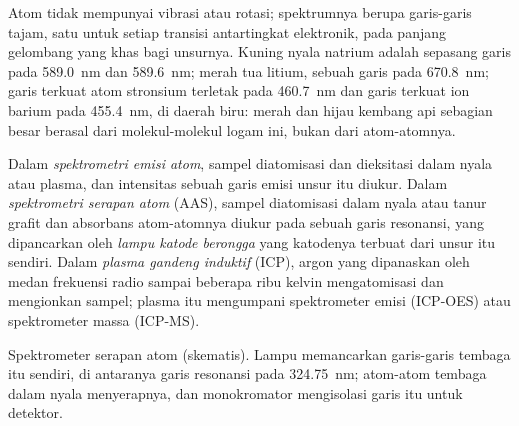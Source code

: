 Atom tidak mempunyai vibrasi atau rotasi; spektrumnya berupa garis-garis
tajam, satu untuk setiap transisi antartingkat elektronik, pada panjang
gelombang yang khas bagi unsurnya. Kuning nyala natrium adalah sepasang garis
pada \qty{589.0}{nm} dan \qty{589.6}{nm}; merah tua litium, sebuah garis pada
\qty{670.8}{nm}; garis terkuat atom stronsium terletak pada \qty{460.7}{nm}
dan garis terkuat ion barium pada
\qty{455.4}{nm}, di daerah biru: merah dan hijau kembang api sebagian besar
berasal dari molekul-molekul logam ini, bukan dari atom-atomnya.

\begin{definition}\label{def:b2:mass-spec-atomic:atomic}
Dalam \emph{spektrometri emisi atom}, sampel
diatomisasi dan dieksitasi dalam nyala atau plasma, dan intensitas sebuah
garis emisi unsur itu diukur. Dalam
\emph{spektrometri serapan atom} (AAS),
sampel diatomisasi dalam nyala atau tanur grafit dan absorbans atom-atomnya
diukur pada sebuah garis resonansi, yang dipancarkan oleh \emph{lampu katode
berongga} yang katodenya terbuat dari unsur itu
sendiri. Dalam \emph{plasma gandeng induktif}
(ICP), argon yang dipanaskan oleh medan frekuensi radio sampai beberapa ribu
kelvin mengatomisasi dan mengionkan sampel; plasma itu mengumpani
spektrometer emisi (ICP-OES) atau spektrometer massa (ICP-MS).
\end{definition}

\begin{omfigure}
\par\vspace{4pt}

{\small Spektrometer serapan atom (skematis). Lampu memancarkan garis-garis
tembaga itu sendiri, di antaranya garis resonansi pada \qty{324.75}{nm};
atom-atom tembaga dalam nyala menyerapnya, dan monokromator mengisolasi
garis itu untuk detektor.}
\end{omfigure}

